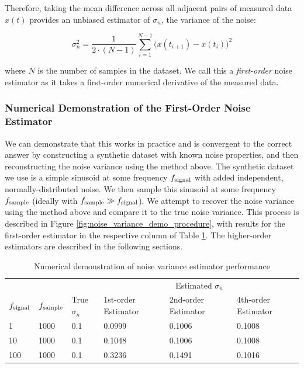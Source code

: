 Therefore, taking the mean difference across all adjacent pairs of measured data $x(t)$ provides an unbiased estimator of $\sigma_n$, the variance of the noise:

\begin{equation}
    \sigma^2_n = \frac{1}{2 \cdot (N-1)} \sum_{i=1}^{N-1} \Big( x(t_{i+1}) - x(t_i) \Big)^2
    \label{eq:1st_order_noise_estimator}
\end{equation}

\noindent where $N$ is the number of samples in the dataset. We call this a \emph{first-order} noise estimator as it takes a first-order numerical derivative of the measured data.

\subsubsection{Numerical Demonstration of the First-Order Noise Estimator}

We can demonstrate that this works in practice and is convergent to the correct answer by constructing a synthetic dataset with known noise properties, and then reconstructing the noise variance using the method above. The synthetic dataset we use is a simple sinusoid at some frequency $f_{\rm signal}$ with added independent, normally-distributed noise. We then sample this sinusoid at some frequency $f_{\rm sample}$ (ideally with $f_{\rm sample} \gg f_{\rm signal}$). We attempt to recover the noise variance using the method above and compare it to the true noise variance. This process is described in Figure \ref{fig:noise_variance_demo_procedure}, with results for the first-order estimator in the respective column of Table \ref{tab:noise_variance_demo}. The higher-order estimators are described in the following sections.

\begin{table}[!h]
    \centering
    \caption{Numerical demonstration of noise variance estimator performance}
    \label{tab:noise_variance_demo}
    \begin{tabular}{@{}lll|lll@{}}
        \toprule
        & & & \multicolumn{3}{c}{Estimated $\sigma_n$} \\
        $f_{\rm signal}$ & $f_{\rm sample}$ & True $\sigma_n$ & 1st-order Estimator & 2nd-order Estimator & 4th-order Estimator \\ \midrule
        1                & 1000             & 0.1             & 0.0999              & 0.1006              & 0.1008              \\
        10               & 1000             & 0.1             & 0.1048              & 0.1006              & 0.1008              \\
        100              & 1000             & 0.1             & 0.3236              & 0.1491              & 0.1016              \\ \bottomrule
    \end{tabular}
\end{table}

